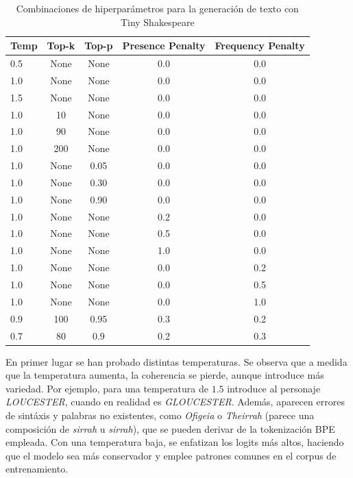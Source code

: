 \documentclass[11pt]{book}
\begin{document}
\begin{table}[h]
    \centering
    \caption{Combinaciones de hiperparámetros para la generación de texto con Tiny Shakespeare}
    \label{tab:combinaciones-tiny}
    \begin{tabular}{l c c c c}
    \toprule
    \textbf{Temp} & \textbf{Top-k} & \textbf{Top-p} & \textbf{Presence Penalty} & \textbf{Frequency Penalty} \\
    \midrule
    0.5 & None & None & 0.0 & 0.0 \\
    1.0 & None & None & 0.0 & 0.0 \\
    1.5 & None & None & 0.0 & 0.0 \\
    1.0 & 10 & None & 0.0 & 0.0 \\
    1.0 & 90 & None & 0.0 & 0.0 \\
    1.0 & 200 & None & 0.0 & 0.0 \\
    1.0 & None & 0.05 & 0.0 & 0.0 \\
    1.0 & None & 0.30 & 0.0 & 0.0 \\
    1.0 & None & 0.90 & 0.0 & 0.0 \\
    1.0 & None & None & 0.2 & 0.0 \\
    1.0 & None & None & 0.5 & 0.0 \\
    1.0 & None & None & 1.0 & 0.0 \\
    1.0 & None & None & 0.0 & 0.2 \\
    1.0 & None & None & 0.0 & 0.5 \\
    1.0 & None & None & 0.0 & 1.0 \\
    0.9 & 100 & 0.95 & 0.3 & 0.2 \\
    0.7 & 80 & 0.9 & 0.2 & 0.3 \\
    \bottomrule
    \end{tabular}
\end{table}


En primer lugar se han probado distintas temperaturas. Se observa que a medida que la temperatura aumenta, la coherencia se pierde, aunque introduce más variedad. Por ejemplo, para una temperatura de $1.5$ introduce al personaje \textit{LOUCESTER}, cuando en realidad es \textit{GLOUCESTER}. Además, aparecen errores de sintáxis y palabras no existentes, como \textit{Ofigeia} o \textit{Theirrah} (parece una composición de \textit{sirrah} u \textit{sirrah}), que se pueden derivar de la tokenización BPE empleada. Con una temperatura baja, se enfatizan los logits más altos, haciendo que el modelo sea más conservador y emplee patrones comunes en el corpus de entrenamiento. 
\end{document}
